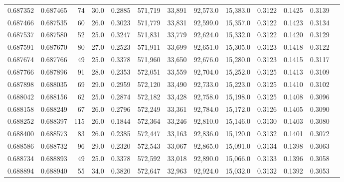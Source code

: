 \begin{tabular}{rrrrrrrrrrrrr}
0.687352 & 0.687465 &    74 & 30.0 &                                     0.2885 & 571,719 &  33,891 &  92,573.0 &  15,383.0 & 0.3122 & 0.1425 & 0.3139 \\
0.687466 & 0.687535 &    60 & 26.0 &                                     0.3023 & 571,779 &  33,831 &  92,599.0 &  15,357.0 & 0.3122 & 0.1423 & 0.3134 \\
0.687537 & 0.687580 &    52 & 25.0 &                                     0.3247 & 571,831 &  33,779 &  92,624.0 &  15,332.0 & 0.3122 & 0.1420 & 0.3129 \\
0.687591 & 0.687670 &    80 & 27.0 &                                     0.2523 & 571,911 &  33,699 &  92,651.0 &  15,305.0 & 0.3123 & 0.1418 & 0.3122 \\
0.687674 & 0.687766 &    49 & 25.0 &                                     0.3378 & 571,960 &  33,650 &  92,676.0 &  15,280.0 & 0.3123 & 0.1415 & 0.3117 \\
0.687766 & 0.687896 &    91 & 28.0 &                                     0.2353 & 572,051 &  33,559 &  92,704.0 &  15,252.0 & 0.3125 & 0.1413 & 0.3109 \\
0.687898 & 0.688035 &    69 & 29.0 &                                     0.2959 & 572,120 &  33,490 &  92,733.0 &  15,223.0 & 0.3125 & 0.1410 & 0.3102 \\
0.688042 & 0.688156 &    62 & 25.0 &                                     0.2874 & 572,182 &  33,428 &  92,758.0 &  15,198.0 & 0.3125 & 0.1408 & 0.3096 \\
0.688158 & 0.688249 &    67 & 26.0 &                                     0.2796 & 572,249 &  33,361 &  92,784.0 &  15,172.0 & 0.3126 & 0.1405 & 0.3090 \\
0.688252 & 0.688397 &   115 & 26.0 &                                     0.1844 & 572,364 &  33,246 &  92,810.0 &  15,146.0 & 0.3130 & 0.1403 & 0.3080 \\
0.688400 & 0.688573 &    83 & 26.0 &                                     0.2385 & 572,447 &  33,163 &  92,836.0 &  15,120.0 & 0.3132 & 0.1401 & 0.3072 \\
0.688586 & 0.688732 &    96 & 29.0 &                                     0.2320 & 572,543 &  33,067 &  92,865.0 &  15,091.0 & 0.3134 & 0.1398 & 0.3063 \\
0.688734 & 0.688893 &    49 & 25.0 &                                     0.3378 & 572,592 &  33,018 &  92,890.0 &  15,066.0 & 0.3133 & 0.1396 & 0.3058 \\
0.688894 & 0.688940 &    55 & 34.0 &                                     0.3820 & 572,647 &  32,963 &  92,924.0 &  15,032.0 & 0.3132 & 0.1392 & 0.3053 \\

\end{tabular}
